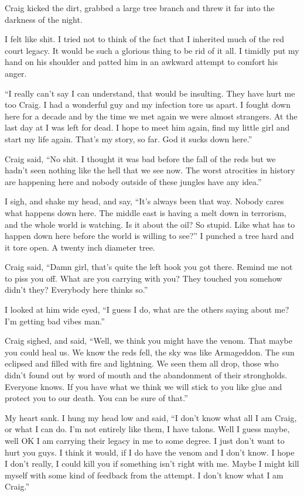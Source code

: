 Craig kicked the dirt, grabbed a large tree branch and threw it far into the darkness of the night.

I felt like shit. I tried not to think of the fact that I inherited much of the red court legacy. It would be such a glorious thing to be rid of it all. I timidly put my hand on his shoulder and patted him in an awkward attempt to comfort his anger.

``I really can't say I can understand, that would be insulting. They have hurt me too Craig. I had a wonderful guy and my infection tore us apart. I fought down here for a decade and by the time we met again we were almost strangers. At the last day at \chichenitza* I was left for dead. I hope to meet him again, find my little girl and start my life again. That's my story, so far. God it sucks down here.''

Craig said, ``No shit. I thought it was bad before the fall of the reds but we hadn't seen nothing like the hell that we see now. The worst atrocities in history are happening here and nobody outside of these jungles have any idea.''

I sigh, and shake my head, and say, ``It's always been that way. Nobody cares what happens down here. The middle east is having a melt down in terrorism, and the whole world is watching. Is it about the oil? So stupid. Like what has to happen down here before the world is willing to see?'' I punched a tree hard and it tore open. A twenty inch diameter tree.

Craig said, ``Damn girl, that's quite the left hook you got there. Remind me not to piss you off. What are you carrying with you? They touched you somehow didn't they? Everybody here thinks so.''

I looked at him wide eyed, ``I guess I do, what are the others saying about me? I'm getting bad vibes man.''

Craig sighed, and said, ``Well, we think you might have the venom. That maybe you could heal us. We know the reds fell, the sky was like Armageddon. The sun eclipsed and filled with fire and lightning. We seen them all drop, those who didn't found out by word of mouth and the abandonment of their strongholds. Everyone knows. If you have what we think we will stick to you like glue and protect you to our death. You can be sure of that.''

My heart sank. I hung my head low and said, ``I don't know what all I am Craig, or what I can do. I'm not entirely like them, I have talons. Well I guess maybe, well OK I am carrying their legacy in me to some degree. I just don't want to hurt you guys. I think it would, if I do have the venom and I don't know. I hope I don't really, I could kill you if something isn't right with me. Maybe I might kill myself with some kind of feedback from the attempt. I don't know what I am Craig.''

